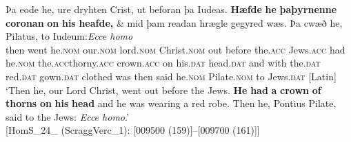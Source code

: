 \documentclass[output=paper,colorlinks,citecolor=brown]{langscibook}
\begin{document}
\ea%
\label{ex:cichosz:4}
\gll Þa   eode   he,     ure     dryhten   Crist,     ut beforan   þa     Iudeas. \textbf{Hæfde}     \textbf{he} \textbf{þa}\textbf{þyrnenne}   \textbf{coronan}   \textbf{on}  \textbf{his}     \textbf{heafde,} \& mid þam     readan     hrægle     gegyred   wæs.   Þa   cwæð he,     Pilatus,     to   Iudeum:\textit{Ecce homo}\\
then  went  he.\textsc{nom}  our.\textsc{nom}  lord.\textsc{nom}  Christ.\textsc{nom}  out before    the.\textsc{acc}  Jews.\textsc{acc}   had    he.\textsc{nom}   the.\textsc{acc}thorny.\textsc{acc}  crown.\textsc{acc}  on  his.\textsc{dat}  head.\textsc{dat}  and  with the.\textsc{dat}  red.\textsc{dat}  gown.\textsc{dat}  clothed    was  then  said he.\textsc{nom}  Pilate.\textsc{nom}  to  Jews.\textsc{dat}  [Latin]\\
\glt‘Then he, our Lord Christ, went out before the Jews. \textbf{He} \textbf{had} \textbf{a} \textbf{crown} \textbf{of} \textbf{thorns} \textbf{on} \textbf{his} \textbf{head} and he was wearing a red robe. Then he, Pontius Pilate, said to the Jews: \textit{Ecce homo}.'\\ \hfill [HomS\_24\_ (ScraggVerc\_1): [009500 (159)]--[009700 (161)]]
\z
      
\end{document}
